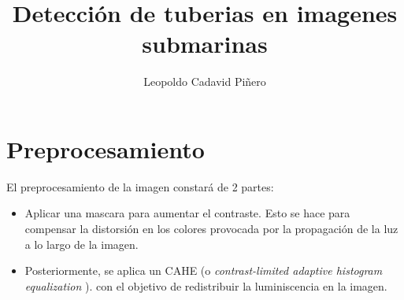 \documentclass[12pt, a4paper]{article}
\title{Detección de tuberias en imagenes submarinas} \\
\author{
Leopoldo Cadavid Piñero
}
\begin{document}
\maketitle
\newpage
\tableofcontents
\newpage

      


\section{Preprocesamiento}

El preprocesamiento de la imagen constará de 2 partes:

\begin{itemize}
    
    \item Aplicar una mascara para aumentar el contraste. Esto se hace para compensar
    la distorsión en los colores provocada por la propagación de la luz a lo largo de la imagen.
    


    \item Posteriormente, se aplica un CAHE (o \textit{contrast-limited adaptive histogram equalization} ).
    con el objetivo de redistribuir la luminiscencia en la imagen. 
    
    

\end{itemize}




\end{document}
